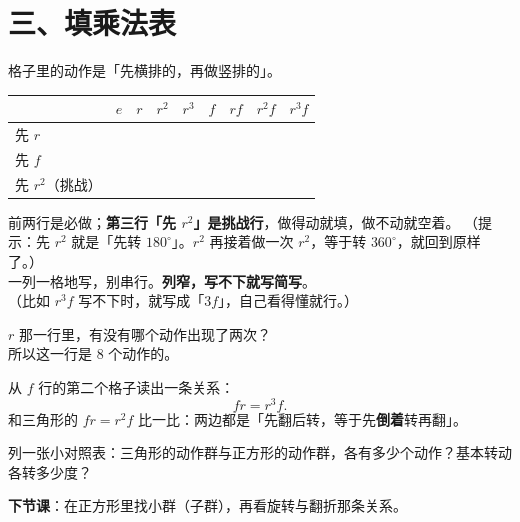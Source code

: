 \section*{三、填乘法表}

\begin{dongshou}[只填 \(r\) 行与 \(f\) 行]
  格子里的动作是「先横排的，再做竖排的」。

  \begin{center}
  {\small
  \begin{tabular}{@{}l|cccccccc@{}}
    \toprule
     & \(e\) & \(r\) & \(r^2\) & \(r^3\) & \(f\) & \(rf\) & \(r^2f\) & \(r^3f\) \\
    \midrule
    \rule{0pt}{2.8ex}先 \(r\) & & & & & & & & \\
    \midrule
    \rule{0pt}{2.8ex}先 \(f\) & & & & & & & & \\
    \midrule
    \rule{0pt}{2.8ex}先 \(r^2\)（挑战） & & & & & & & & \\
    \bottomrule
  \end{tabular}}
  \end{center}
  前两行是必做；\textbf{第三行「先 \(r^2\)」是挑战行}，做得动就填，做不动就空着。
  （提示：先 \(r^2\) 就是「先转 \(180^\circ\)」。\(r^2\) 再接着做一次 \(r^2\)，等于转 \(360^\circ\)，就回到原样了。）\\
  一列一格地写，别串行。\textbf{列窄，写不下就写简写}。\\
  （比如 \(r^3f\) 写不下时，就写成「\(3f\)」，自己看得懂就行。）
\end{dongshou}

\begin{sikao}
  \(r\) 那一行里，有没有哪个动作出现了两次？\underline{\hspace{3em}}\\
  所以这一行是 \(8\) 个动作的\underline{\hspace{6em}}。
\end{sikao}

\begin{example}
  从 \(f\) 行的第二个格子读出一条关系：
  \[
    fr=r^3f .
  \]
  和三角形的 \(fr=r^2f\) 比一比：两边都是「先翻后转，等于先\textbf{倒着}转再翻」。
\end{example}

\begin{xiaojie}
  列一张小对照表：三角形的动作群与正方形的动作群，各有多少个动作？基本转动各转多少度？
\end{xiaojie}

\noindent\textbf{下节课}：在正方形里找小群（子群），再看旋转与翻折那条关系。